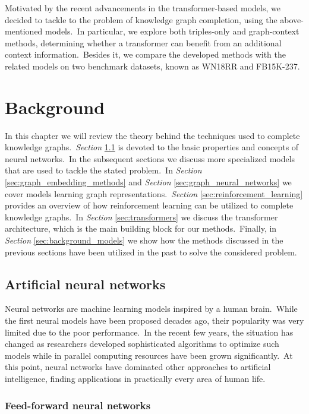 \documentclass[longabstract, english, mgr]{iithesis}
\newcommand\numberedchapter[1]{\setlength\topskip{3cm}\chapter{#1}\setlength\topskip{0cm}}
\theoremstyle{default_theorem_style}\newtheorem{theorem}{Theorem}
\theoremstyle{default_theorem_style}\newtheorem{definition}{Definition}
\begin{document}
\noindent Motivated by the recent advancements in the transformer-based models, we decided to tackle to the problem
of knowledge graph completion, using the above-mentioned models.\ In particular, we explore both
triples-only and graph-context methods, determining whether a transformer can benefit from an additional context
information.\ Besides it, we compare the developed methods with the related models on two benchmark datasets, known
as WN18RR and FB15K-237.

\numberedchapter{Background}\label{chapter:background}

In this chapter we will review the theory behind the techniques used to complete knowledge
graphs.\ \textit{Section} \ref{sec:neural_networks}
is devoted to the basic properties and concepts of neural networks.\ In the subsequent sections we discuss more
specialized models that are used to tackle the stated problem.\ In
\textit{Section} \ref{sec:graph_embedding_methods} and \textit{Section} \ref{sec:graph_neural_networks} we cover
models learning graph representations.\ \textit{Section} \ref{sec:reinforcement_learning} provides an overview of
how reinforcement learning can be utilized to complete knowledge graphs.\ In \textit{Section}
\ref{sec:transformers} we discuss the transformer architecture, which is the main building block for our
methods.\ Finally, in \textit{Section} \ref{sec:background_models} we show how the methods discussed in the previous
sections have been utilized in the past to solve the considered problem.

\section{Artificial neural networks}\label{sec:neural_networks}

Neural networks are machine learning models inspired by a human brain.\ While the first neural models have
been proposed decades ago, their popularity was very limited due to the poor performance.\ In the recent
few years, the situation has changed as researchers developed sophisticated algorithms to optimize such models while
in parallel computing resources have been grown significantly.\ At this point, neural networks have dominated other
approaches to artificial intelligence, finding applications in practically every area of human life.

\subsection{Feed-forward neural networks}\label{subsec:feed_forward}
\end{document}
